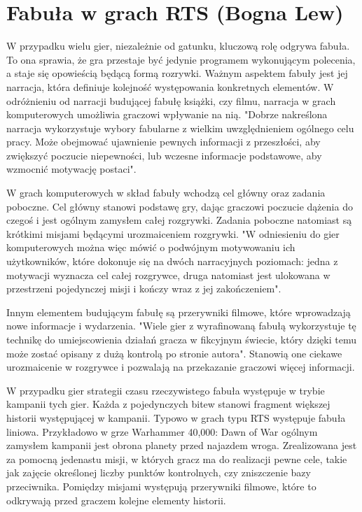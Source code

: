 \section{Fabuła w grach RTS (Bogna Lew)}\label{s:fabula}
W przypadku wielu gier, niezależnie od gatunku, kluczową rolę odgrywa fabuła. To ona sprawia, że gra przestaje być
jedynie programem wykonującym polecenia, a staje się opowieścią będącą formą rozrywki. Ważnym aspektem fabuły jest jej
narracja, która definiuje kolejność występowania konkretnych elementów. W odróżnieniu od narracji budującej
fabułę książki, czy filmu, narracja w grach komputerowych umożliwia graczowi wpływanie na nią. "Dobrze nakreślona
narracja wykorzystuje wybory fabularne z wielkim uwzględnieniem ogólnego celu pracy. Może obejmować ujawnienie pewnych
informacji z przeszłości, aby zwiększyć poczucie niepewności, lub wczesne informacje podstawowe, aby wzmocnić motywację
postaci"\cite{level_design}.

W grach komputerowych w skład fabuły wchodzą cel główny oraz zadania poboczne. Cel główny stanowi podstawę gry, dając
graczowi poczucie dążenia do czegoś i jest ogólnym zamysłem całej rozgrywki. Zadania poboczne natomiast są krótkimi
misjami będącymi urozmaiceniem rozgrywki. "W odniesieniu do gier komputerowych można więc mówić o podwójnym motywowaniu
ich użytkowników, które dokonuje się na dwóch narracyjnych poziomach: jedna z motywacji wyznacza cel całej
rozgrywce, druga natomiast jest ulokowana w przestrzeni pojedynczej misji i kończy wraz z jej zakończeniem"\cite{olbrzymwcieniu}.

Innym elementem budującym fabułę są przerywniki filmowe, które wprowadzają nowe informacje i wydarzenia. "Wiele gier z
wyrafinowaną fabułą wykorzystuje tę technikę do umiejscowienia działań gracza w fikcyjnym świecie, który dzięki temu
może zostać opisany z dużą kontrolą po stronie autora"\cite{understanding_games}. Stanowią one ciekawe urozmaicenie w rozgrywce i
pozwalają na przekazanie graczowi więcej informacji.

W przypadku gier strategii czasu rzeczywistego fabuła występuje w trybie kampanii tych gier. Każda z pojedynczych bitew
stanowi fragment większej historii występującej w kampanii. Typowo w grach typu RTS występuje fabuła liniowa.
Przykładowo w grze Warhammer 40,000: Dawn of War ogólnym zamysłem kampanii jest obrona planety przed najazdem wroga.
Zrealizowana jest za pomocną jedenastu misji, w których gracz ma do realizacji pewne cele, takie jak zajęcie określonej
liczby punktów kontrolnych, czy zniszczenie bazy przeciwnika. Pomiędzy misjami występują przerywniki filmowe, które
to odkrywają przed graczem kolejne elementy historii.


